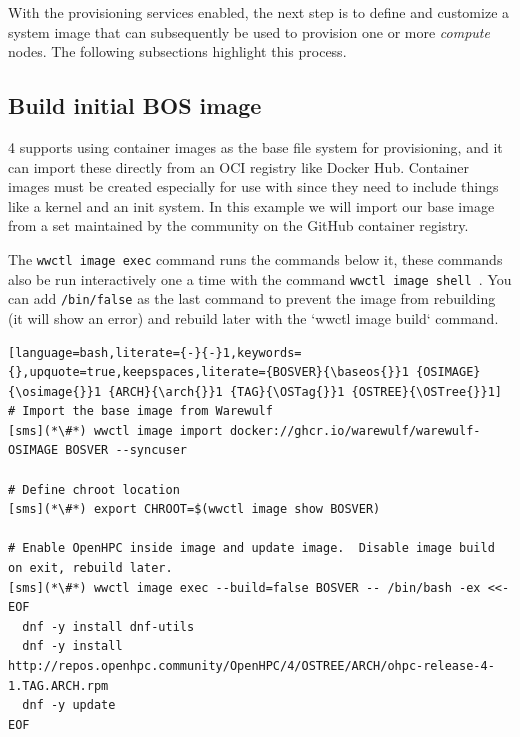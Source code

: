 With the provisioning services enabled, the next step is to define and
customize a system image that can subsequently be used to provision one or more
{\em compute} nodes. The following subsections highlight this process.

\subsection{Build initial BOS image} \label{sec:assemble_bos}
\Warewulf{} 4 supports using container images as the base file system for
provisioning, and it can import these directly from an OCI registry like
Docker Hub. Container images must be created especially for use with \Warewulf{}
since they need to include things like a kernel and an init system. In this
example we will import our base image from a set maintained by the \Warewulf{}
community on the GitHub container registry.

The \texttt{wwctl image exec} command runs the commands below it, these commands
also be run interactively one a time with the command \texttt{wwctl image
shell \baseos{}}. You can add \texttt{/bin/false} as the last command to prevent
the image from rebuilding (it will show an error) and rebuild later with the
`wwctl image build` command.

\begin{lstlisting}[language=bash,literate={-}{-}1,keywords={},upquote=true,keepspaces,literate={BOSVER}{\baseos{}}1 {OSIMAGE}{\osimage{}}1 {ARCH}{\arch{}}1 {TAG}{\OSTag{}}1 {OSTREE}{\OSTree{}}1]
# Import the base image from Warewulf
[sms](*\#*) wwctl image import docker://ghcr.io/warewulf/warewulf-OSIMAGE BOSVER --syncuser

# Define chroot location
[sms](*\#*) export CHROOT=$(wwctl image show BOSVER)

# Enable OpenHPC inside image and update image.  Disable image build on exit, rebuild later.
[sms](*\#*) wwctl image exec --build=false BOSVER -- /bin/bash -ex <<- EOF
  dnf -y install dnf-utils
  dnf -y install http://repos.openhpc.community/OpenHPC/4/OSTREE/ARCH/ohpc-release-4-1.TAG.ARCH.rpm
  dnf -y update
EOF
\end{lstlisting}
